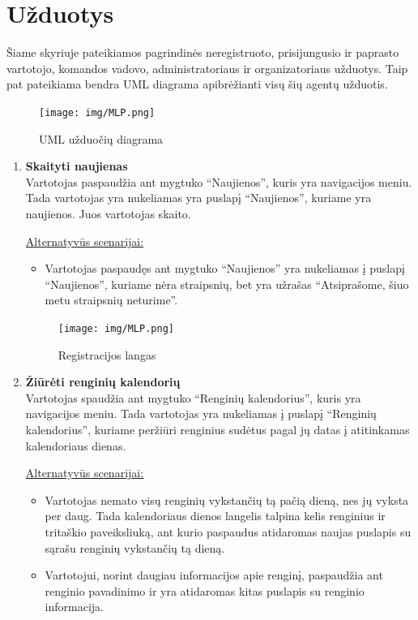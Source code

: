 \documentclass{VUMIFPSkursinis}
\begin{document}
    \section{Užduotys}\label{uzduotys}
		Šiame skyriuje pateikiamos pagrindinės neregistruoto, prisijungusio ir paprasto vartotojo, komandos vadovo, administratoriaus ir organizatoriaus užduotys.
		Taip pat pateikiama bendra UML diagrama apibrėžianti visų šių agentų užduotis.
			\noindent
			
			\begin{figure}[H]
                \centering
                \texttt{[image: img/MLP.png]}
                \caption{UML užduočių diagrama}
                \label{fig:uzduociu-diagrama}
            \end{figure}

		\begin{enumerate} [label = \textbf{U\arabic*.}]
			\item \textbf{Skaityti naujienas} \\
				Vartotojas paspaudžia ant mygtuko “Naujienos”, kuris yra navigacijos meniu. Tada vartotojas yra nukeliamas yra puslapį “Naujienos”, kuriame yra naujienos. Juos vartotojas skaito.
				
				\underline{Alternatyvūs scenarijai:}
				\begin{itemize}
					\item Vartotojas paspaudęs ant mygtuko “Naujienos” yra nukeliamas į puslapį “Naujienos”, kuriame nėra straipsnių, bet yra užrašas “Atsiprašome, šiuo metu straipsnių neturime”. 
				\end{itemize}

				\begin{figure}[H]
					\centering
					\texttt{[image: img/MLP.png]}
					\caption{Registracijos langas}
					\label{fig:uzd_registracija}
				\end{figure}
				
			\item \textbf{Žiūrėti renginių kalendorių} \\
				Vartotojas spaudžia ant mygtuko “Renginių kalendorius”, kuris yra navigacijos meniu. Tada vartotojas yra nukeliamas į puslapį “Renginių kalendorius”, kuriame peržiūri renginius sudėtus pagal jų datas į atitinkamas kalendoriaus dienas.
				
				\underline{Alternatyvūs scenarijai:}
				\begin{itemize}
					\item Vartotojas nemato visų renginių vykstančių tą pačią dieną, nes jų vyksta per daug. Tada kalendoriaus dienos langelis talpina kelis renginius ir tritaškio paveiksliuką, ant kurio paspaudus atidaromas naujas puslapis su sąrašu renginių vykstančių tą dieną.
					\item Vartotojui, norint daugiau informacijos apie renginį, paspaudžia ant renginio pavadinimo ir yra atidaromas kitas puslapis su renginio informacija.
				\end{itemize}
				

\end{enumerate}
\end{document}
